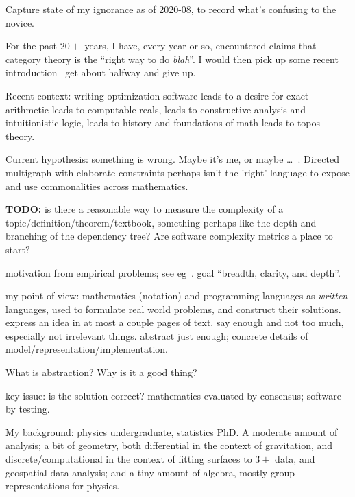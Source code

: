 \documentclass[11pt]{book}
\begin{document}
Capture state of my ignorance as of 2020-08,
to record what's confusing to the novice.

For the past $20+$ years, I have, every year or so,
encountered claims that
category theory is the ``right way to do \textit{blah}''.
I would then pick up some recent 
introduction~\cite{adamek_herrlich_strecker_1990,
asperti_longo_1991,awodey_2010,
barr_wells_2020,
geroch_1985,hillman_2001_cat_primer,lawvere_schanuel_2009_conceptual_math,
leinster_2016_basic_category_theory,
maclane_1998_cat_for_working_mathematician,nLab_2020,
riehl_2017_cath_in_context,
spivakd_2013_cath_for_scientists,spivakd_2014_cath_for_sciences} 
get about halfway and give up.

Recent context: 
writing optimization software 
leads to a desire for exact arithmetic 
leads to computable reals,
leads to constructive analysis and intuitionistic logic,
leads to history and foundations of math 
leads to topos theory.

Current hypothesis: something is wrong.
Maybe it's me, or maybe \ldots\ . 
Directed multigraph with elaborate constraints 
perhaps isn't the 'right' language to
expose and use commonalities across mathematics.

\textbf{TODO:} is there a reasonable way to measure 
the complexity of a topic/definition/theorem/textbook,
something perhaps like the depth and branching of the
dependency tree? Are software complexity metrics a place to start?

motivation from empirical problems; 
see eg~\cite{maclane1981mathModels}.
goal ``breadth, clarity, and depth''.

my point of view: 
mathematics (notation) and programming languages
as \textit{written} languages,
used to formulate real world problems,
and construct their solutions.
express an idea in at most a couple pages of text.
say enough and not too much, especially not irrelevant things.
abstract just enough; 
concrete details of model/representation/implementation.

What is abstraction? Why is it a good thing? 

key issue: is the solution correct?
mathematics evaluated by consensus;
software by testing.

My background: physics undergraduate, statistics PhD.
A moderate amount of analysis; 
a bit of geometry, both
differential in the context of gravitation, and
discrete/computational in the context of fitting surfaces to
$3+$ data, and geospatial data analysis;
and a tiny amount of algebra, mostly group representations
for physics.
\end{document}
